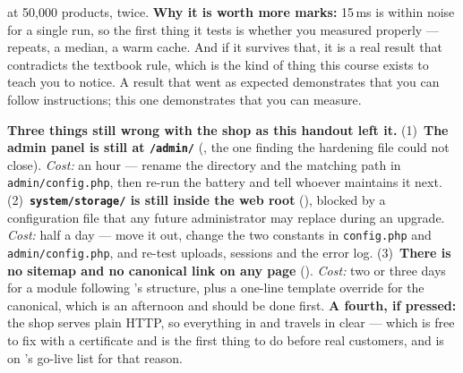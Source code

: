 \begin{ans}
        at 50{,}000 products, twice. \textbf{Why it is worth more marks:} 15\,ms
        is within noise for a single run, so the first thing it tests is
        whether you measured properly --- repeats, a median, a warm cache. And
        if it survives that, it is a real result that contradicts the
        textbook rule, which is the kind of thing this course exists to teach
        you to notice. A result that went as expected demonstrates that you
        can follow instructions; this one demonstrates that you can measure.
  \item \textbf{Three things still wrong with the shop as this handout left
        it.} (1)~\textbf{The admin panel is still at \texttt{/admin/}}
        (, the one finding the hardening file could not close).
        \emph{Cost:} an hour --- rename the directory and the matching path in
        \texttt{admin/config.php}, then re-run the battery and tell whoever
        maintains it next. (2)~\textbf{\texttt{system/storage/} is still inside
        the web root} (), blocked by a configuration file that
        any future administrator may replace during an upgrade. \emph{Cost:}
        half a day --- move it out, change the two constants in
        \texttt{config.php} and \texttt{admin/config.php}, and re-test uploads,
        sessions and the error log. (3)~\textbf{There is no sitemap and no
        canonical link on any page} (). \emph{Cost:} two or three
        days for a module following 's structure, plus a
        one-line template override for the canonical, which is an afternoon
        and should be done first. \textbf{A fourth, if pressed:} the shop
        serves plain HTTP, so everything in  and
         travels in clear --- which is free to fix with a
        certificate and is the first thing to do before real customers, and is
        on 's go-live list for that reason.
\end{ans}
